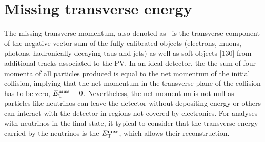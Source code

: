 \section{Missing transverse energy}

The missing transverse momentum, also denoted as \MET\ is the transverse component of the negative vector sum of the fully calibrated objects (electrons, muons, photons, hadronically decaying taus and jets) as well
as soft objects [130] from additional tracks associated to the PV. In an ideal detector, the the sum of four-momenta of all particles produced is equal to the net momentum of the initial collision, implying that the net momentum in the transverse plane of the collision has to be zero, $E_{\text{T}}^{\text{miss}}=0$. Nevertheless, the net momentum is not null as particles like neutrinos can leave the detector without depositing energy or others can interact with the detector in regions not covered by electronics. For analyses with neutrinos in the final state, it typical to consider that the transverse energy carried by the neutrinos is the $E_{\text{T}}^{\text{miss}}$, which allows their reconstruction.